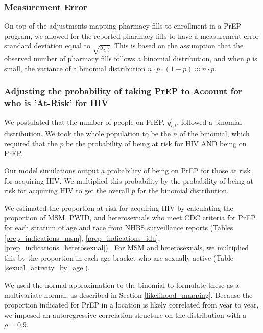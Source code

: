 \documentclass{article}
\begin{document}
\subsubsection{Measurement Error}
On top of the adjustments mapping pharmacy fills to enrollment in a PrEP program, we allowed for the reported pharmacy fills to have a measurement error standard deviation equal to $\sqrt{y_{i,t}}$. This is based on the assumption that the observed number of pharmacy fills follows a binomial distribution, and when $p$ is small, the variance of a binomial distribution $n \cdot p \cdot (1-p) \approx n \cdot p$.

\subsubsection{Adjusting the probability of taking PrEP to Account for who is 'At-Risk' for HIV}

We postulated that the number of people on PrEP, $y^\prime_{i,t}$, followed a binomial distribution. We took the whole population to be the $n$ of the binomial, which required that the $p$ be the probability of being at risk for HIV AND being on PrEP.

Our model simulations output a probability of being on PrEP for those at risk for acquiring HIV. We multiplied this probability by the probability of being at risk for acquiring HIV to get the overall $p$ for the binomial distribution.

We estimated the proportion at risk for acquiring HIV by calculating the proportion of MSM, PWID, and heterosexuals who meet CDC criteria for PrEP\cite{cdc_prep_guidelines} for each stratum of age and race from NHBS surveillance reports (Tables \ref{prep_indications_msm}, \ref{prep_indications_idu}, \ref{prep_indications_heterosexual}).\cite{nhbs24, nhbs22, nhbs19}. For MSM and heterosexuals, we multiplied this by the proportion in each age bracket who are sexually active (Table \ref{sexual_activity_by_age}).

We used the normal approximation to the binomial to formulate these as a multivariate normal, as described in Section \ref{likelihood_mapping}. Because the proportion indicated for PrEP in a location is likely correlated from year to year, we imposed an autoregressive correlation structure on the distribution with a $\rho=0.9$.
\end{document}
